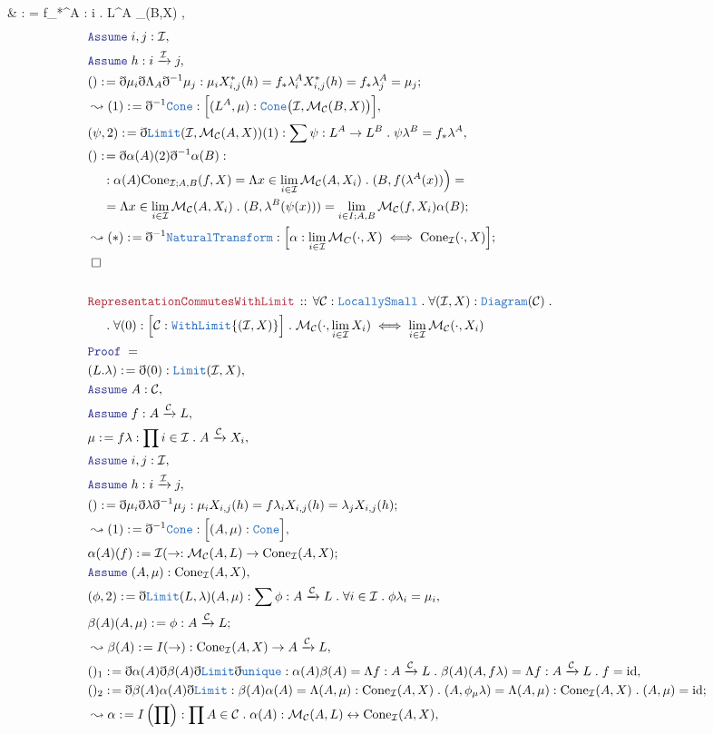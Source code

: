 \documentclass[12pt]{scrartcl}
\newcommand{\TYPE}[1]{\textcolor{NavyBlue}{\mathtt{#1}}}
\newcommand{\LOGIC}[1]{\textcolor{Blue}{\mathtt{#1}}}
\newcommand{\THM}[1]{\textcolor{Maroon}{\mathtt{#1}}}
\renewcommand{\.}{\; . \;}
\newcommand{\de}{: \kern 0.1pc =}
\newcommand{\Theorem}[2]{& \THM{#1} \, :: \, #2 \\ & \Proof = \\ }
\newcommand{\NewLine}{\\ & \kern 1pc}
\newcommand{\Page}[1]{ \begin{align*} #1 \end{align*}   }
\newcommand{ \bd }{ \ByDef }
\DeclareMathOperator*{\id}{id}
\newcommand{\Mor}{\mathcal{M}}
\newcommand{\ToBij}{\leftrightarrow}
\newcommand{\Arrow}{\xrightarrow}
\newcommand{\Say}[3]{& #1 \de #2 : #3, \\}
\newcommand{\Conclude}[3]{& #1 \de #2 : #3; \\}
\newcommand{\Derive}[3]{& \leadsto #1 \de #2 : #3, \\}
\newcommand{\DeriveConclude}[3]{& \leadsto #1 \de #2 : #3 ; \\}
\newcommand{\Assume}[2]{& \LOGIC{Assume} \; #1 : #2, \\}
\newcommand{\QED}{\; \square}
\newcommand{\EndProof}{& \QED \\}
\newcommand{\ByDef}{\eth}
\newcommand{\Proof}{\LOGIC{Proof} \; }
\newcommand{\NT}{\TYPE{NaturalTransform}}
\newcommand{\C}{\mathcal{C}}
\newcommand{\I}{\mathcal{I}}
\begin{document}
{	\Say{\mu}{ f_*\lambda^A}{ \prod i \in \I \.  L^A \to \Mor_{\C}(B,X) }
}\Page{
	\Assume{i,j}{\I}
	\Assume{h}{i \Arrow{\I} j }
	\Conclude{()}{  \bd \mu_i \bd \Lambda_A  \bd^{-1} \mu_j     }
	{  \mu_i X_{i,j}^*(h) =  f_* \lambda^A_i X_{i,j}^*(h) = f_*  \lambda^A_j = \mu_j   }
	\Derive{(1)}{\bd^{-1} \TYPE{Cone}}{ \Big[ (L^A,\mu) : \TYPE{Cone}\big(\I,\Mor_{\C}(B,X) \big) \Big]   }
	\Say{(\psi,2)}{\bd \TYPE{Limit}(\I,\Mor_{\C}(A,X))(1)}{ \sum \psi : L^A \to L^B \. \psi\lambda^B = f_*\lambda^A  }
	\Conclude{()}{ \bd \alpha(A)  (2)  \bd^{-1}\alpha(B)}
	{    
		\NewLine :
		\alpha(A) \mathrm{Cone}_{\I;A,B}(f,X)  = 
		\Lambda x \in \lim_{i \in \I} \Mor_{\C}(A,X_i) \. (B, f(\lambda^A(x)) \Big) =  \NewLine =
		\Lambda x \in \lim_{i \in \I} \Mor_{\C}(A,X_i) \.  (B,  \lambda^B(\psi(x)) ) 
								  =	
		\lim_{i \in I;A,B} \Mor_{\C} (f,X_i) \alpha(B)
	}
	\DeriveConclude{(*)}{\bd^{-1}\NT}
	{ \Big[ \alpha : \lim_{i \in \I} \Mor_C(\cdot,X) \iff \mathrm{Cone}_\I(\cdot,X) \Big]  }
	\EndProof
	\\
	\Theorem{RepresentationCommutesWithLimit}{
			\forall \C : \TYPE{LocallySmall} \.
			\forall (\I,X) : \TYPE{Diagram}(\C) \. \NewLine \.
			\forall (0) : \Big[ \C : \TYPE{WithLimit}\{ (\I,X) \} \Big] \.
			\Mor_\C(\cdot, \lim_{i \in \I} X_i) \iff \lim_{i \in \I} \Mor_\C(\cdot,X_i)
		}
	\Say{(L.\lambda)}{\bd(0)}{\TYPE{Limit}(\I,X)}
	\Assume{A}{\C}
	\Assume{f}{A \Arrow{\C} L}
	\Say{\mu}{f\lambda}{\prod i \in \I \. A \Arrow{\C} X_i}
	\Assume{i,j}{\I}
	\Assume{h}{i \Arrow{\I} j}
	\Conclude{ ()  }{ \bd \mu_i \bd \lambda \bd^{-1} \mu_j  }
	{ \mu_i X_{i,j}(h) = f \lambda_i X_{i,j}(h)  = \lambda_j X_{i,j}(h)     }
	\Derive{(1)}{\bd^{-1} \TYPE{Cone}}{\Big[(A,\mu) : \TYPE{Cone} \Big]}
	\Conclude{\alpha(A)(f)}{\I(\to}{ \Mor_\C(A,L) \to \mathrm{Cone}_\I(A,X) }
	\Assume{(A,\mu)}{\mathrm{Cone}_\I(A,X)}
	\Say{(\phi,2)}{\bd \TYPE{Limit}(L,\lambda)(A,\mu)}{ 
		\sum \phi : A \Arrow{\C} L \. \forall i \in \I \. \phi \lambda_i = \mu_i  }
	\Conclude{\beta(A)(A,\mu)}{\phi}{A \Arrow{\C} L}
	\Derive{\beta(A)}{I(\to)}{\mathrm{Cone}_\I(A,X) \to A \Arrow{\C} L}
	\Say{()_1}{ \bd \alpha(A) \bd \beta(A) \bd \TYPE{Limit} \bd \TYPE{unique}}
	{   
		\alpha(A)\beta(A) = 
		\Lambda f : A \Arrow{\C} L \.   \beta(A)(A,f\lambda) = 
		\Lambda f : A \Arrow{\C} L \. f = 
		\id  
	}
	\Conclude{()_2}{\bd \beta(A)\alpha(A) \bd \TYPE{Limit}}
	{
		\beta(A) \alpha(A) =
		\Lambda (A,\mu) : \mathrm{Cone}_\I(A,X) \.  (A,\phi_\mu \lambda) =
		\Lambda (A,\mu) : \mathrm{Cone}_\I(A,X) \. (A,\mu) =
		\id
	}
	\Derive{\alpha}{I\left(\prod\right)}{ \prod A \in \C \. \alpha(A) : \Mor_\C(A,L) \ToBij \mathrm{Cone}_\I(A,X)}
}
\end{document}
